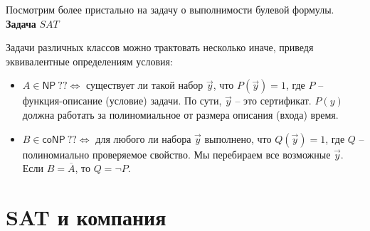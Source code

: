 \documentclass[a4paper,12pt]{article}
\newcommand{\NPclass}{\mathsf{NP}}
\newcommand{\coNPclass}{\mathsf{coNP}}
\begin{document}
Посмотрим более пристально на задачу о выполнимости булевой формулы.
\textbf{Задача} $SAT$
\begin{algorithmic}
\end{algorithmic}
Задачи различных классов можно трактовать несколько иначе, приведя эквивалентные определениям условия:
\begin{itemize}
    \item $A \in \NPclass\ ?? \Longleftrightarrow $ существует ли такой набор $\vec{y}$, что $P(\vec{y}) = 1$, где $P$ -- функция-описание (условие) задачи. По сути, $\vec{y}$ -- это сертификат. $P(y)$ должна работать за полиномиальное от размера описания (входа) время.
    \item $B \in \coNPclass\ ?? \Longleftrightarrow $ для любого ли набора $\vec{y}$ выполнено, что $Q(\vec{y}) = 1$, где $Q$ -- полиномиально проверяемое свойство. Мы перебираем все возможные $\vec{y}$. Если $B = \overline{A}$, то $Q = \neg P$. 
\end{itemize}


\newpage
\section{SAT и компания}
\end{document}
